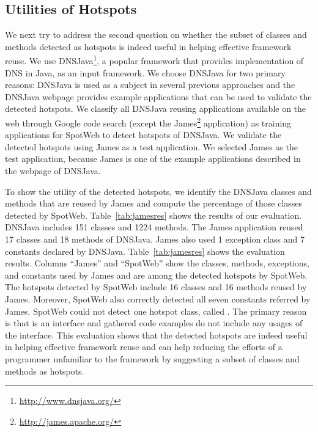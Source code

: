 \subsection{Utilities of Hotspots}
\label{sec:hotspotuse}
We next try to address the second question on whether the subset of classes and methods
detected as hotspots is indeed useful in helping effective framework reuse. 
We use DNSJava\footnote{\url{http://www.dnsjava.org/}},
a popular framework that provides implementation of DNS in Java, as an input framework. 
We choose DNSJava for two primary reasons: DNSJava is used as a subject in several
previous approaches and the DNSJava webpage provides example applications that can be used to validate
the detected hotspots. We classify all DNSJava reusing applications available on the web through Google code search
(except the James\footnote{\url{http://james.apache.org/}} 
application) as training applications for SpotWeb to detect 
hotspots of DNSJava. We validate the detected hotspots using James as a test application.
We selected James as the test application, because James is one of the example applications
described in the webpage of DNSJava.

To show the utility of the detected hotspots, we identify the DNSJava classes 
and methods that are reused by James and compute the percentage of those classes detected
by SpotWeb. Table~\ref{tab:jamesres} shows the results of our evaluation.
DNSJava includes 151 classes and 1224 methods.  The
James application reused 17 classes and 18 methods of DNSJava. James also used 1 exception
class and 7 constants declared by DNSJava. Table~\ref{tab:jamesres} shows
the evaluation results. Columns ``James'' and ``SpotWeb'' show the 
classes, methods, exceptions, and constants used by James and are among
the detected hotspots by SpotWeb. The hotspots detected by SpotWeb
include 16 classes and 16 methods reused by James. Moreover, SpotWeb also correctly
detected all seven constants referred by James. SpotWeb could not detect one hotspot
class, called . The primary reason is that  is an interface
and gathered code examples do not include any usages of the  interface.
This evaluation shows that the detected hotspots are indeed useful in helping
effective framework reuse and can help reducing the efforts of a programmer unfamiliar
to the framework by suggesting a subset of classes and methods as hotspots.

